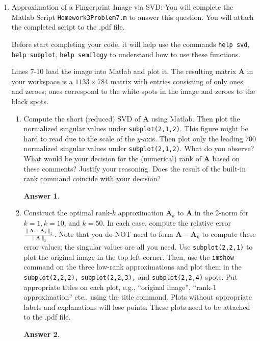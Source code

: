 \documentclass{article}
\theoremstyle{definition}
\newtheorem*{answer}{Answer}
\newcommand{\mat}[1]{\bm{#1}}
\begin{document}
\begin{enumerate}[leftmargin=\labelsep]
\begin{proof}
	      \end{proof}

	\item Approximation of a Fingerprint Image via SVD: You will complete the Matlab Script \texttt{Homework3Problem7.m} to answer this question. You will attach the completed script to the .pdf file.

	      Before start completing your code, it will help use the commands \texttt{help svd}, \texttt{help subplot}, \texttt{help semilogy} to understand how to use these functions.

	      Lines 7-10 load the image into Matlab and plot it. The resulting matrix \(\mat{A}\) in your workspace is a \(1133 \times 784\) matrix with entries consisting of only ones and zeroes; ones correspond to the white spots in the image and zeroes to the black spots.
	      \begin{enumerate}
		      \item Compute the short (reduced) SVD of \(\mat{A}\) using Matlab. Then plot the normalized singular values under \texttt{subplot(2,1,2)}. This figure might be hard to read due to the scale of the \(y\)-axis. Then plot only the leading 700 normalized singular values under \texttt{subplot(2,1,2)}. What do you observe? What would be your decision for the (numerical) rank of \(\mat{A}\) based on these comments? Justify your reasoning. Does the result of the built-in rank command coincide with your decision?
		            \begin{answer}

		            \end{answer}

		      \item Construct the optimal rank-\(k\) approximation \(\mat{A}_k\) to \(\mat{A}\) in the 2-norm for\( k = 1, k = 10\), and \(k = 50\). In each case, compute the relative error \(\frac{\|\mat{A} - \mat{A}_k\|_2}{\|\mat{A}\|_2}\). Note that you do NOT need to form \(\mat{A} - \mat{A}_k\) to compute these error values; the singular values are all you need. Use \texttt{subplot(2,2,1)} to plot the original image in the top left corner. Then, use the \texttt{imshow} command on the three low-rank approximations and plot them in the \texttt{subplot(2,2,2),} \texttt{subplot(2,2,3),} and \texttt{subplot(2,2,4)} spots. Put appropriate titles on each plot, e.g., ``original image'', ``rank-1 approximation'' etc., using the title command. Plots without appropriate labels and explanations will lose points. These plots need to be attached to the .pdf file.
		            \begin{answer}


\end{answer}
\end{enumerate}
\end{enumerate}
\end{document}
